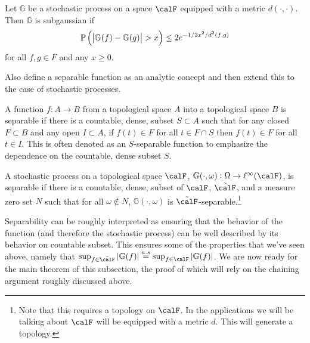 \begin{definition}
	\label{def:subgaussian}
	Let \(\mathbb{G}\) be a stochastic process on a space \(\calF\) equipped with a metric \(d(\cdot,\cdot)\). Then  \(\mathbb{G}\) is subgaussian if
	\begin{equation}
		\label{eq:subgaussian}
		\P\left(\left|\mathbb{G}(f)-\mathbb{G}(g)\right|> x\right)\leq 2e^{-1/2x^2/d^2(f,g)}
	\end{equation}
	for all \(f,g \in F\) and any  \(x\geq 0\).
\end{definition}

Also define a separable function as an analytic concept and then extend this to the case of stochastic processes.

\begin{definition}
	\label{def:separable-function}
	A function \(f:A\to B\) from a topological space \(A\) into a topological space  \(B\) is separable if there is a countable, dense, subset  \(S \subset A\) such that  for any closed \(F \subset B\) and any open \(I \subset A\), if  \(f(t) \in F\) for all  \(t \in F \cap S\) then  \(f(t) \in F\) for all  \(t \in I\). This is often denoted as an \(S\)-separable function to emphasize the dependence on the countable, dense subset  \(S\).
\end{definition}

\begin{definition}
	\label{def:separable-process}
	A stochastic process on a topological space \(\calF\), \(\mathbb{G}(\cdot,\omega):\Omega \to \ell^\infty(\calF)\), is separable if there is a countable, dense, subset of \(\calF\), \(\tilde\calF\), and a measure zero set \(N\) such that for all \(\omega\not\in N\),  \(\mathbb{G}(\cdot,\omega)\) is \(\tilde\calF\)-separable.\footnote{Note that this requires a topology on \(\calF\). In the applications we will be talking about  \(\calF\) will be equipped with a metric  \(d\). This will generate a topology.} 
\end{definition}

Separability can be roughly interpreted as ensuring that the behavior of the function (and therefore the stochastic process) can be well described by its behavior on countable subset. This ensures some of the properties that we've seen above, namely that \(\sup_{f\in\tilde\calF}|\mathbb{G}(f)| \overset{a.s}{=} \sup_{f\in\calF}|\mathbb{G}(f)|\). We are now ready for the main theorem of this subsection, the proof of which will rely on the chaining argument roughly discussed above.

